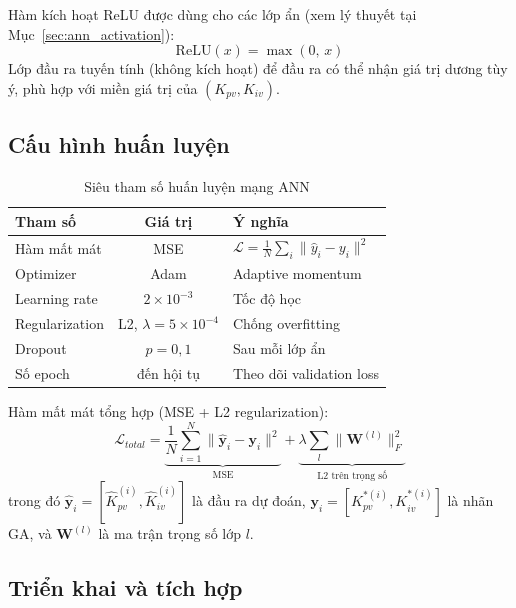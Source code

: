 Hàm kích hoạt ReLU được dùng cho các lớp ẩn (xem lý thuyết tại
Mục~\ref{sec:ann_activation}):
\begin{equation}
    \text{ReLU}(x) = \max(0,\, x)
    \label{eq:relu_method}
\end{equation}
Lớp đầu ra tuyến tính (không kích hoạt) để đầu ra có thể nhận giá trị
dương tùy ý, phù hợp với miền giá trị của $(K_{pv}, K_{iv})$.

\subsection{Cấu hình huấn luyện}

\begin{table}[H]
    \centering
    \caption{Siêu tham số huấn luyện mạng ANN}
    \label{tab:ann_train_cfg}
    \renewcommand{\arraystretch}{1.3}
    \begin{tabular}{|l|c|l|}
    \hline
    \textbf{Tham số} & \textbf{Giá trị} & \textbf{Ý nghĩa} \\
    \hline
    Hàm mất mát   & MSE      & $\mathcal{L} = \frac{1}{N}\sum_i\|\hat{y}_i - y_i\|^2$ \\
    Optimizer      & Adam     & Adaptive momentum \\
    Learning rate  & $2\times10^{-3}$ & Tốc độ học \\
    Regularization & L2, $\lambda = 5\times10^{-4}$ & Chống overfitting \\
    Dropout        & $p = 0{,}1$      & Sau mỗi lớp ẩn \\
    Số epoch       & đến hội tụ       & Theo dõi validation loss \\
    \hline
    \end{tabular}
\end{table}

Hàm mất mát tổng hợp (MSE + L2 regularization):
\begin{equation}
    \mathcal{L}_{total} =
    \underbrace{\frac{1}{N}\sum_{i=1}^{N}
        \bigl\|\hat{\mathbf{y}}_i - \mathbf{y}_i\bigr\|^2}_{\text{MSE}}
    + \underbrace{\lambda \sum_{l} \|\mathbf{W}^{(l)}\|_F^2}_{\text{L2 trên trọng số}}
    \label{eq:ann_loss}
\end{equation}
trong đó $\hat{\mathbf{y}}_i = [\hat{K}_{pv}^{(i)}, \hat{K}_{iv}^{(i)}]$
là đầu ra dự đoán, $\mathbf{y}_i = [K_{pv}^{*(i)}, K_{iv}^{*(i)}]$ là
nhãn GA, và $\mathbf{W}^{(l)}$ là ma trận trọng số lớp $l$.

\subsection{Triển khai và tích hợp}

